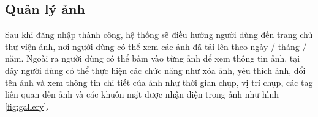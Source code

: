 \subsection{Quản lý ảnh}

Sau khi đăng nhập thành công, hệ thống sẽ điều hướng người dùng đến trang chủ thư viện ảnh, nơi người dùng có thể xem các ảnh đã tải lên theo ngày / tháng / năm. Ngoài ra người dùng có thể bấm vào từng ảnh để xem thông tin ảnh. tại đây người dùng có thể thực hiện các chức năng như xóa ảnh, yêu thích ảnh, đổi tên ảnh và xem thông tin chi tiết của ảnh như thời gian chụp, vị trí chụp, các tag liên quan đến ảnh và các khuôn mặt được nhận diện trong ảnh như hình \ref{fig:gallery}.

\begin{figure}[H]
    \centering
    \begin{subfigure}{0.32\textwidth}

\end{subfigure}
\end{figure}

